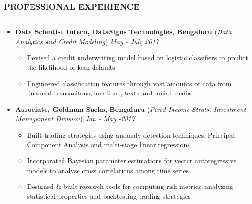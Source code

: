 \documentclass[10pt,a4paper,English]{article}
\newcommand\roottitle[1]{\vspace{-4mm}\subsubsection*{\uppercase{#1}}\vspace{-0.3em}\nopagebreak[4]\hrule\vspace{4mm}}
\newcommand\itemyear[1]{\hfill \emph{\color{itemyear} #1}}
\newcommand\itemenv{\setlength\itemsep{0.5pt} \addtolength{\itemindent}{-5mm}\vspace{-1.5mm}}
\begin{document}
\vspace{1.5mm}

\roottitle{Professional Experience}
\begin{itemize} \itemenv

    \item \textbf{Data Scientist Intern, DataSigns Technologies, Bengaluru } \hfill({\emph{Data Analytics and Credit Modeling}}) \itemyear{May - July 2017}
        \begin{itemize} \itemenv
            \item Devised a credit underwriting model based on logistic classifiers to predict the likelihood of loan defaults
            \item Engineered classification features through vast amounts of data from financial transacitons, locations, texts and social media
        \end{itemize}

    \item \textbf{Associate, Goldman Sachs, Bengaluru} \hfill (\emph{Fixed Income Strats, Investment Management Division}) \itemyear{Jan - May -2017}
        \begin{itemize} \itemenv
            \item Built trading strategies using anomaly detection techniques, Principal Component Analysis and multi-stage linear regressions
            \item Incorporated Bayesian parameter estimations for vector autoregressive models to analyse cross correlations among time series
            \item Designed \& built research tools for computing risk metrics, analyzing statistical properties and backtesting trading strategies
        \end{itemize}


\end{itemize}
\end{document}
